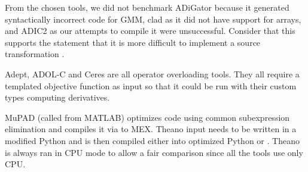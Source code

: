 \documentclass[suppldata]{article}
\begin{document}
From the chosen tools, we did not benchmark ADiGator because it generated syntactically incorrect code for GMM, clad as it did not have support for arrays, and ADIC2 as our attempts to compile it were unsuccessful. Consider that this supports the statement that it is more difficult to implement a source transformation .

Adept, ADOL-C and Ceres are all operator overloading \Cpp{} tools. They all require a templated objective function as input so that it could be run with their custom types computing derivatives. 

MuPAD (called from MATLAB) optimizes code using common subexpression elimination and compiles it via \Cpp{} to MEX. Theano input needs to be written in a modified Python and is then compiled either into optimized Python or \Cpp{}. Theano is always ran in CPU mode to allow a fair comparison since all the tools use only CPU.
\end{document}
